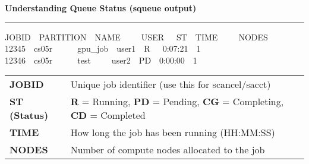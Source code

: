 \documentclass[11pt, a4paper, landscape]{article}
\begin{document}
\begin{tcolorbox}[colback=white, colframe=bordercolor, boxrule=1pt, arc=5mm, left=4mm, right=4mm, top=4mm, bottom=4mm]
\textbf{\large Understanding Queue Status (squeue output)}\\[-3mm]
\textcolor{mainblue}{\rule{\dimexpr\linewidth-8mm\relax}{2pt}}
\vspace{2mm}

\begin{tcolorbox}[colback=lightgray, colframe=bordercolor, boxrule=1pt, arc=3mm, left=3mm, right=3mm, top=3mm, bottom=3mm]
\small\ttfamily
JOBID~~PARTITION~~NAME~~~~~USER~~~ST~~TIME~~~~~NODES\\
12345~~cs05r~~~~~~gpu\_job~~user1~~R~~~0:07:21~~1\\
12346~~cs05r~~~~~~test~~~~~user2~~PD~~0:00:00~~1
\end{tcolorbox}

\vspace{2.5mm}

\small
\begin{tabular}{@{}p{}p{}@{}}
\textbf{JOBID} & Unique job identifier (use this for scancel/sacct) \\[1mm]
\textbf{ST (Status)} & \textbf{R} = Running, \textbf{PD} = Pending, \textbf{CG} = Completing, \textbf{CD} = Completed \\[1mm]
\textbf{TIME} & How long the job has been running (HH:MM:SS) \\[1mm]
\textbf{NODES} & Number of compute nodes allocated to the job \\
\end{tabular}
\end{tcolorbox}

\vfill
\newpage
\end{document}
